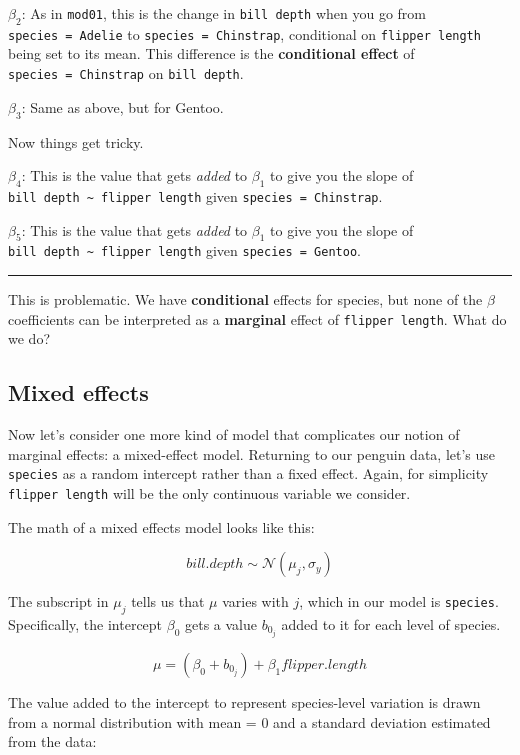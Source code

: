 \documentclass[
]{article}
\begin{document}
\(\beta_2\): As in \texttt{mod01}, this is the change in
\texttt{bill\ depth} when you go from \texttt{species\ =\ Adelie} to
\texttt{species\ =\ Chinstrap}, conditional on \texttt{flipper\ length}
being set to its mean. This difference is the \textbf{conditional
effect} of \texttt{species\ =\ Chinstrap} on \texttt{bill\ depth}.

\(\beta_3\): Same as above, but for Gentoo.

Now things get tricky.

\(\beta_4\): This is the value that gets \emph{added} to \(\beta_1\) to
give you the slope of
\texttt{bill\ depth\ \textasciitilde{}\ flipper\ length} given
\texttt{species\ =\ Chinstrap}.

\(\beta_5\): This is the value that gets \emph{added} to \(\beta_1\) to
give you the slope of
\texttt{bill\ depth\ \textasciitilde{}\ flipper\ length} given
\texttt{species\ =\ Gentoo}.

\begin{center}\rule{0.5\linewidth}{0.5pt}\end{center}

This is problematic. We have \textbf{conditional} effects for species,
but none of the \(\beta\) coefficients can be interpreted as a
\textbf{marginal} effect of \texttt{flipper\ length}. What do we do?

\hypertarget{mixed-effects}{%
\subsection{Mixed effects}\label{mixed-effects}}

Now let's consider one more kind of model that complicates our notion of
marginal effects: a mixed-effect model. Returning to our penguin data,
let's use \texttt{species} as a random intercept rather than a fixed
effect. Again, for simplicity \texttt{flipper\ length} will be the only
continuous variable we consider.

The math of a mixed effects model looks like this:

\[ bill.depth \sim \mathcal{N}(\mu_j, \sigma_y) \]

The subscript in \(\mu_j\) tells us that \(\mu\) varies with \(j\),
which in our model is \texttt{species}. Specifically, the intercept
\(\beta_0\) gets a value \(b_{0_j}\) added to it for each level of
species.

\[ \mu =  (\beta_0 + b_{0_j}) + \beta_1flipper.length \]

The value added to the intercept to represent species-level variation is
drawn from a normal distribution with mean = 0 and a standard deviation
estimated from the data:
\end{document}
